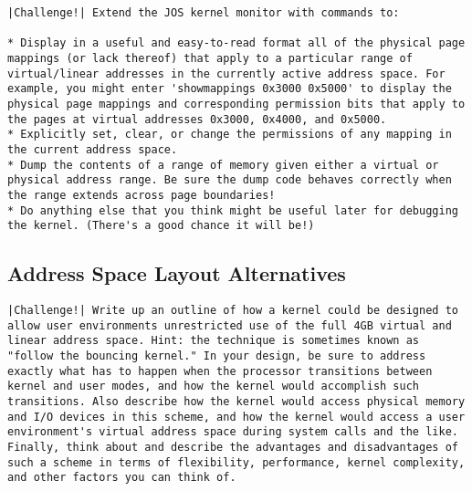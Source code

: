 \documentclass{article}
\begin{document}
\begin{CJK*}{UTF8}{gkai}
\begin{lstlisting}[style=challenge]
|Challenge!| Extend the JOS kernel monitor with commands to:

* Display in a useful and easy-to-read format all of the physical page mappings (or lack thereof) that apply to a particular range of virtual/linear addresses in the currently active address space. For example, you might enter 'showmappings 0x3000 0x5000' to display the physical page mappings and corresponding permission bits that apply to the pages at virtual addresses 0x3000, 0x4000, and 0x5000.
* Explicitly set, clear, or change the permissions of any mapping in the current address space.
* Dump the contents of a range of memory given either a virtual or physical address range. Be sure the dump code behaves correctly when the range extends across page boundaries!
* Do anything else that you think might be useful later for debugging the kernel. (There's a good chance it will be!)
\end{lstlisting}

\subsection{Address Space Layout Alternatives}

\begin{lstlisting}[style=challenge]
|Challenge!| Write up an outline of how a kernel could be designed to allow user environments unrestricted use of the full 4GB virtual and linear address space. Hint: the technique is sometimes known as "follow the bouncing kernel." In your design, be sure to address exactly what has to happen when the processor transitions between kernel and user modes, and how the kernel would accomplish such transitions. Also describe how the kernel would access physical memory and I/O devices in this scheme, and how the kernel would access a user environment's virtual address space during system calls and the like. Finally, think about and describe the advantages and disadvantages of such a scheme in terms of flexibility, performance, kernel complexity, and other factors you can think of.
\end{lstlisting}


\end{CJK*}
\end{document}
